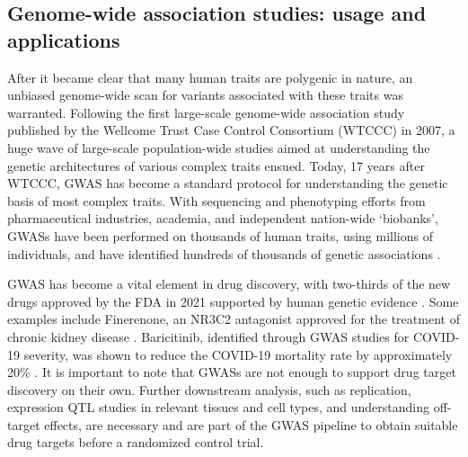 \subsection{Genome-wide association studies: usage and applications}

After it became clear that many human traits are polygenic in nature, an unbiased genome-wide scan for variants associated with these traits was warranted. Following the first large-scale genome-wide association study published by the Wellcome Trust Case Control Consortium (WTCCC) in 2007, a huge wave of large-scale population-wide studies aimed at understanding the genetic architectures of various complex traits ensued. Today, 17 years after WTCCC, GWAS has become a standard protocol for understanding the genetic basis of most complex traits. With sequencing and phenotyping efforts from pharmaceutical industries, academia, and independent nation-wide `biobanks', GWASs have been performed on thousands of human traits, using millions of individuals, and have identified hundreds of thousands of genetic associations \cite{GWASCatalog}. %

GWAS has become a vital element in drug discovery, with two-thirds of the new drugs approved by the FDA in 2021 supported by human genetic evidence \cite{rusina2023genetic,ochoa2022human,abdellaoui202315}. Some examples include Finerenone, an NR3C2 antagonist approved for the treatment of chronic kidney disease \cite{teumer2019genome,bakris2020effect}. Baricitinib, identified through GWAS studies for COVID-19 severity, was shown to reduce the COVID-19 mortality rate by approximately 20\% \cite{favalli2020baricitinib,horowitz2022genome}. It is important to note that GWASs are not enough to support drug target discovery on their own. Further downstream analysis, such as replication, expression QTL studies in relevant tissues and cell types, and understanding off-target effects, are necessary and are part of the GWAS pipeline to obtain suitable drug targets before a randomized control trial.

